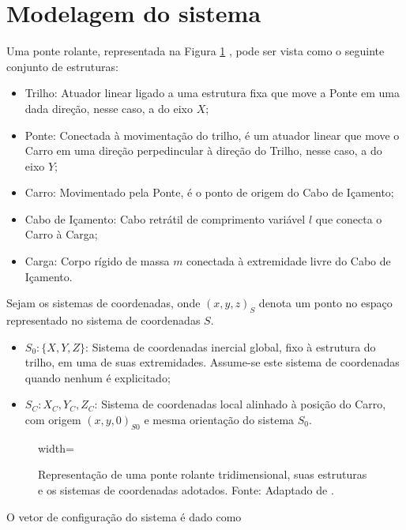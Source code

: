 \documentclass{ppgeesa}
\begin{document}
\section{Modelagem do sistema}

Uma ponte rolante, representada na Figura \ref{fig:crane_tikz} , pode ser vista como o seguinte conjunto de estruturas: 

\begin{itemize}
  \item Trilho: Atuador linear ligado a uma estrutura fixa que move a Ponte em uma dada direção, nesse caso, a do eixo $X$;
  \item Ponte: Conectada à movimentação do trilho, é um atuador linear que move o Carro em uma direção perpedincular à direção do Trilho, nesse caso, a do eixo $Y$;
  \item Carro: Movimentado pela Ponte, é o ponto de origem do Cabo de Içamento;
  \item Cabo de Içamento: Cabo retrátil de comprimento variável $l$ que conecta o Carro à Carga;
  \item Carga: Corpo rígido de massa $m$ conectada à extremidade livre do Cabo de Içamento.
\end{itemize}

Sejam os sistemas de coordenadas, onde $(x,y,z)_{S}$ denota um ponto no espaço representado no sistema de coordenadas $S$.

\begin{itemize}
  \item $S_0 : \{X,Y,Z\}$: Sistema de coordenadas inercial global, fixo à estrutura do trilho, em uma de suas extremidades. Assume-se este sistema de coordenadas quando nenhum é explicitado;
  \item $S_C : {X_C,Y_C,Z_C}$: Sistema de coordenadas local alinhado à posição do Carro, com origem $(x,y,0)_{S0}$ e mesma orientação do sistema $S_0$.
\end{itemize}

\begin{figure}[H]
\begin{adjustbox}{width=\linewidth}
  
\end{adjustbox}
\caption{Representação de uma ponte rolante tridimensional, suas estruturas e os sistemas de coordenadas adotados. Fonte: Adaptado de \cite{thiago2026}.}
\label{fig:crane_tikz}
\end{figure}


O vetor de configuração do sistema é dado como
\end{document}

